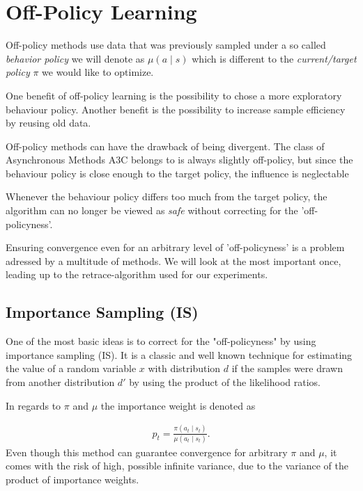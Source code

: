 \pagebreak
\section{Off-Policy Learning}
\raggedbottom 

Off-policy methods use data that was previously sampled under a so called  \textit{behavior policy} we will denote as $\mu(a \mid s)$  which is different to the \textit{current/target policy}  $\pi$ we would like to optimize.

One benefit of off-policy learning is the possibility to chose a more exploratory behaviour policy. 
Another benefit is the possibility to increase sample efficiency by reusing old data.
\citep{Degris12}

Off-policy methods can have the drawback of being divergent.
The class of Asynchronous Methods A3C belongs to is always slightly off-policy, but since the behaviour policy is close enough to the target policy, the influence is neglectable

Whenever the behaviour policy differs too much from the target policy, the algorithm can no longer be viewed as \textit{safe} without correcting for the 'off-policyness'. \citep{Munos16}

Ensuring convergence even for an arbitrary level of 'off-policyness' is a problem adressed by a multitude of methods.
We will look at the most important once, leading up to the retrace-algorithm used for our experiments.

\subsection{Importance Sampling (IS)}

One of the most basic ideas is to correct for the "off-policyness" by using importance sampling (IS).
It is a classic and well known technique for estimating the value of a random variable $x$ with distribution $d$  if the samples were drawn from another distribution $d'$
by using the product of the likelihood ratios.

In regards to $\pi$ and $\mu$ the importance weight is denoted as

\begin{align}
{
p_t = \frac{\pi (a_t \mid s_t)}{\mu (a_t \mid s_t)}.
}
\label{IW}
\end{align}
Even though this method can guarantee convergence \citep{Munos16} for arbitrary $\pi$ and $\mu$, it comes with the risk of high, possible infinite  variance, due to the variance of the product of importance weights.

